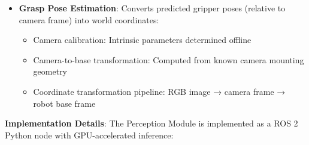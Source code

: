 \begin{itemize}
    The output is a ranked list of candidate grasps with confidence scores, allowing the Planning Module to select collision-free grasps.
    
    \item \textbf{Grasp Pose Estimation}: Converts predicted gripper poses (relative to camera frame) into world coordinates:
    \begin{itemize}
        \item Camera calibration: Intrinsic parameters determined offline
        \item Camera-to-base transformation: Computed from known camera mounting geometry
        \item Coordinate transformation pipeline: RGB image → camera frame → robot base frame
    \end{itemize}
   
\end{itemize}

\textbf{Implementation Details}:
The Perception Module is implemented as a ROS 2 Python node with GPU-accelerated inference:

